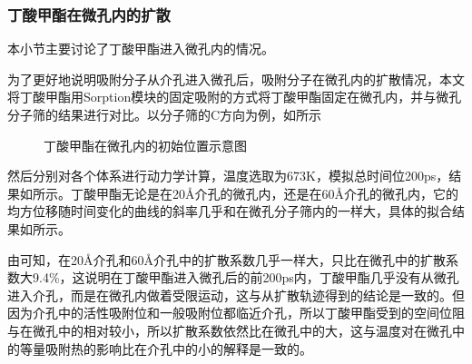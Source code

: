 \subsubsection{丁酸甲酯在微孔内的扩散}
\par{本小节主要讨论了丁酸甲酯进入微孔内的情况。}
\par{为了更好地说明吸附分子从介孔进入微孔后，吸附分子在微孔内的扩散情况，本文将丁酸甲酯用Sorption模块的固定吸附的方式将丁酸甲酯固定在微孔内，并与微孔分子筛的结果进行对比。以分子筛的C方向为例，如所示}

\begin{figure}[H]
    \centering

    \caption{丁酸甲酯在微孔内的初始位置示意图}
    \label{fig:MMe}
\end{figure}
\par{然后分别对各个体系进行动力学计算，温度选取为673K，模拟总时间位200ps，结果如所示。丁酸甲酯无论是在20Å介孔的微孔内，还是在60Å介孔的微孔内，它的均方位移随时间变化的曲线的斜率几乎和在微孔分子筛内的一样大，具体的拟合结果如所示。}
\par{由可知，在20Å介孔和60Å介孔中的扩散系数几乎一样大，只比在微孔中的扩散系数大9.4\%，这说明在丁酸甲酯进入微孔后的前200ps内，丁酸甲酯几乎没有从微孔进入介孔，而是在微孔内做着受限运动，这与从扩散轨迹得到的结论是一致的。但因为介孔中的活性吸附位和一般吸附位都临近介孔，所以丁酸甲酯受到的空间位阻与在微孔中的相对较小，所以扩散系数依然比在微孔中的大，这与温度对在微孔中的等量吸附热的影响比在介孔中的小的解释是一致的。}

